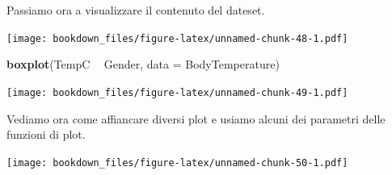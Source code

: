 \documentclass[]{book}
\newenvironment{Shaded}{\begin{snugshade}}{\end{snugshade}}
\newcommand{\DataTypeTok}[1]{\textcolor[rgb]{0.13,0.29,0.53}{#1}}
\newcommand{\DecValTok}[1]{\textcolor[rgb]{0.00,0.00,0.81}{#1}}
\newcommand{\KeywordTok}[1]{\textcolor[rgb]{0.13,0.29,0.53}{\textbf{#1}}}
\newcommand{\NormalTok}[1]{#1}
\newcommand{\OperatorTok}[1]{\textcolor[rgb]{0.81,0.36,0.00}{\textbf{#1}}}
\newcommand{\StringTok}[1]{\textcolor[rgb]{0.31,0.60,0.02}{#1}}
\begin{document}
Passiamo ora a visualizzare il contenuto del dateset.

\begin{Shaded}
\end{Shaded}

\texttt{[image: bookdown\_files/figure-latex/unnamed-chunk-48-1.pdf]}

\begin{Shaded}
\begin{Highlighting}[]
\KeywordTok{boxplot}\NormalTok{(TempC }\OperatorTok{~}\StringTok{ }\NormalTok{Gender, }\DataTypeTok{data =}\NormalTok{ BodyTemperature)}
\end{Highlighting}
\end{Shaded}

\texttt{[image: bookdown\_files/figure-latex/unnamed-chunk-49-1.pdf]}

Vediamo ora come affiancare diversi plot e usiamo alcuni dei parametri delle funzioni di plot.

\begin{Shaded}
\end{Shaded}

\texttt{[image: bookdown\_files/figure-latex/unnamed-chunk-50-1.pdf]}

\begin{Shaded}
\end{Shaded}
\end{document}
